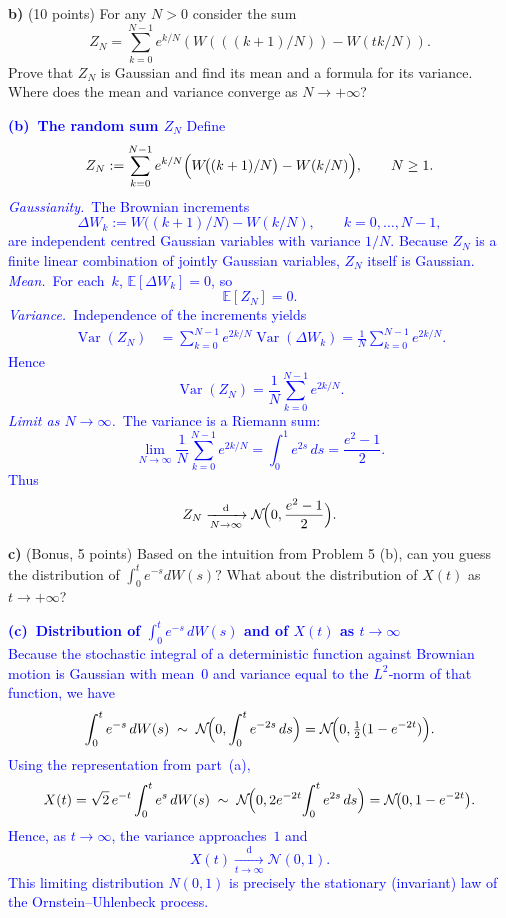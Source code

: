 \documentclass{article}
\begin{document}
\textbf{b)}   (10 points) For any $N > 0$ consider the sum
$$Z_N = \sum_{k=0}^{N-1} e^{k/N}(W(((k+1)/N)) - W(tk/N)).$$
Prove that $Z_N$ is Gaussian and find its mean and a formula for its variance. Where does the mean and variance converge as $N \rightarrow +\infty$?


\textcolor{blue}{
    \textbf{(b) The random sum $Z_N$}
Define  
$$
Z_N:=\sum_{k=0}^{N-1}e^{k/N}\Bigl(W\!\bigl((k+1)/N\bigr)-W(k/N)\Bigr), \qquad N\ge1.
$$
\emph{Gaussianity.} The Brownian increments  
$$
\Delta W_{k}:=W\!\bigl((k+1)/N\bigr)-W(k/N),\qquad k=0,\dots,N-1,
$$
are independent centred Gaussian variables with variance $1/N$.  Because $Z_N$ is a finite linear combination of jointly Gaussian variables, $Z_N$ itself is Gaussian.
\emph{Mean.} For each $k$, $\mathbb E[\Delta W_{k}]=0$, so
$$
\boxed{\mathbb E[Z_N]=0.}
$$
\emph{Variance.} Independence of the increments yields
\begin{align*}
\operatorname{Var}(Z_N)
&=\sum_{k=0}^{N-1}e^{2k/N}\operatorname{Var}(\Delta W_{k})
=\frac1N\sum_{k=0}^{N-1}e^{2k/N}.
\end{align*}
Hence
$$
\boxed{\operatorname{Var}(Z_N)=\frac1N\sum_{k=0}^{N-1}e^{2k/N}.}
$$
\emph{Limit as $N\to\infty$.} The variance is a Riemann sum:
$$
\lim_{N\to\infty}\frac1N\sum_{k=0}^{N-1}e^{2k/N}=\int_{0}^{1}e^{2s}\,ds=\frac{e^{2}-1}{2}.
$$
Thus
$$
Z_N \xrightarrow[N\to\infty]{\;\text{d}\;} \mathcal N\!\Bigl(0,\frac{e^{2}-1}{2}\Bigr).
$$
}


\textbf{c)}   (Bonus, 5 points) Based on the intuition from Problem 5 (b), can you guess the distribution of 
$\int_0^t e^{-s} dW(s)?$ 
What about the distribution of $X(t)$ as $t \rightarrow +\infty$?

\textcolor{blue}{
    \textbf{(c) Distribution of $\displaystyle\int_{0}^{t}e^{-s}\,dW(s)$ and of $X(t)$ as $t\to\infty$} \\
Because the stochastic integral of a deterministic function against Brownian motion is Gaussian with mean $0$ and variance equal to the $L^{2}$‑norm of that function, we have  
$$
\int_{0}^{t}e^{-s}\,dW(s)\;\sim\;\mathcal N\!\Bigl(0,\int_{0}^{t}e^{-2s}\,ds\Bigr)
          =\mathcal N\!\Bigl(0,\tfrac12(1-e^{-2t})\Bigr).
$$
Using the representation from part (a),
$$
X(t)=\sqrt2\,e^{-t}\int_{0}^{t}e^{s}\,dW(s)
     \;\sim\;\mathcal N\!\Bigl(0,2e^{-2t}\!\int_{0}^{t}e^{2s}\,ds\Bigr)
     =\mathcal N\!\bigl(0,1-e^{-2t}\bigr).
$$
Hence, as $t\to\infty$, the variance approaches $1$ and
$$
\boxed{X(t)\xrightarrow[t\to\infty]{\;\text{d}\;}\mathcal N(0,1).}
$$
This limiting distribution $N(0,1)$ is precisely the stationary (invariant) law of the Ornstein–Uhlenbeck process.
}
\end{document}
